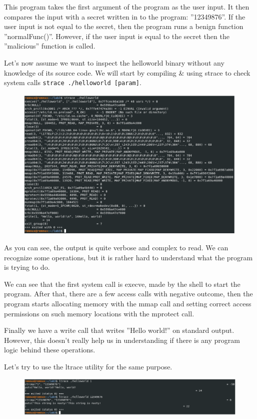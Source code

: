 \documentclass[]{project_plan}
\begin{document}
This program takes the first argument of the program as the user input. It
then compares the input with a secret written in to the program: ”12349876”.
If the user input is not equal to the secret, then the program runs a benign
function ”normalFunc()”. However, if the user input is equal to the secret then
the ”malicious” function is called.

Let’s now assume we want to inspect the helloworld binary without any
knowledge of its source code. We will start by compiling \& using strace to check system
calls \lstinline|strace ./helloworld [param]|.

\begin{figure}[H]
  \centering
  \includegraphics[width=\linewidth]{strace.png}
\end{figure}

As you can see, the output is quite verbose and complex to read. We can
recognize some operations, but it is rather hard to understand what the program
is trying to do.

We can see that the first system call is execve, made by the shell to start the
program. After that, there are a few access calls with negative outcome, then
the program starts allocating memory with the mmap call and setting correct
access permissions on such memory locations with the mprotect call.

Finally
we have a write call that writes ”Hello world!” on standard output. However,
this doesn’t really help us in understanding if there is any program logic behind
these operations.

Let’s try to use the ltrace utility for the same purpose.

\begin{figure}[H]
  \centering
  \includegraphics[width=\linewidth]{ltrace.png}
\end{figure}
\end{document}
